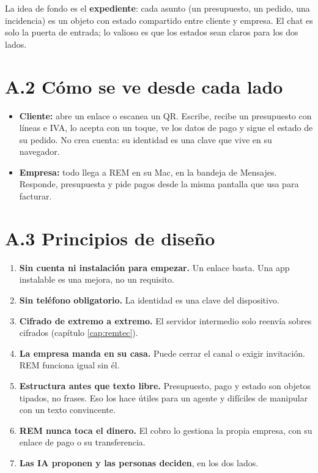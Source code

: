 La idea de fondo es el \textbf{expediente}: cada asunto (un presupuesto, un pedido, una incidencia) es un objeto con estado compartido entre cliente y empresa. El chat es solo la puerta de entrada; lo valioso es que los estados sean claros para los dos lados.

\section{A.2 Cómo se ve desde cada lado}\label{a.2-cuxf3mo-se-ve-desde-cada-lado}

\begin{itemize}
\tightlist
\item
  \textbf{Cliente:} abre un enlace o escanea un QR. Escribe, recibe un presupuesto con líneas e IVA, lo acepta con un toque, ve los datos de pago y sigue el estado de su pedido. No crea cuenta: su identidad es una clave que vive en su navegador.
\item
  \textbf{Empresa:} todo llega a REM en su Mac, en la bandeja de Mensajes. Responde, presupuesta y pide pagos desde la misma pantalla que usa para facturar.
\end{itemize}

\section{A.3 Principios de diseño}\label{a.3-principios-de-diseuxf1o}

\begin{enumerate}
\def\labelenumi{\arabic{enumi}.}
\tightlist
\item
  \textbf{Sin cuenta ni instalación para empezar.} Un enlace basta. Una app instalable es una mejora, no un requisito.
\item
  \textbf{Sin teléfono obligatorio.} La identidad es una clave del dispositivo.
\item
  \textbf{Cifrado de extremo a extremo.} El servidor intermedio solo reenvía sobres cifrados (capítulo \ref{cap:remtec}).
\item
  \textbf{La empresa manda en su casa.} Puede cerrar el canal o exigir invitación. REM funciona igual sin él.
\item
  \textbf{Estructura antes que texto libre.} Presupuesto, pago y estado son objetos tipados, no frases. Eso los hace útiles para un agente y difíciles de manipular con un texto convincente.
\item
  \textbf{REM nunca toca el dinero.} El cobro lo gestiona la propia empresa, con su enlace de pago o su transferencia.
\item
  \textbf{Las IA proponen y las personas deciden}, en los dos lados.
\end{enumerate}

